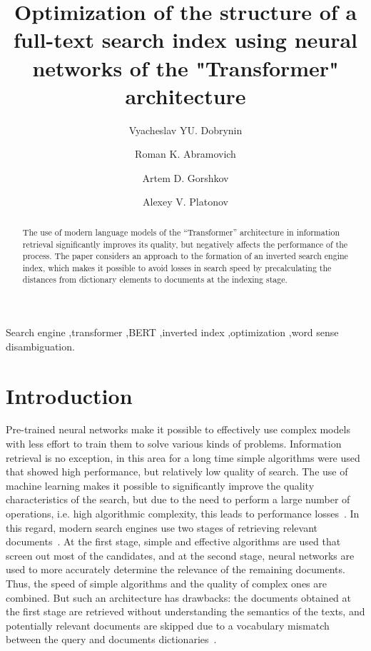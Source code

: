 \documentclass[
    twocolumn,
]{template/ceurart}
\begin{document}
    \title{Optimization of the structure of a full-text search index using neural networks of the "Transformer" architecture}
    \author[1]{Vyacheslav YU. Dobrynin}
    \author[1]{Roman K. Abramovich}
    \author[1]{Artem D. Gorshkov}
    \author[1]{Alexey V. Platonov}
    \address[1]{ITMO University, Kronverksky Pr. 49, bldg. A, Saint-Petersburg, 197101, Russian Federation}
    \begin{abstract}
        The use of modern language models of the ``Transformer'' architecture in information retrieval significantly
        improves its quality, but negatively affects the performance of the process.
        The paper considers an approach to the formation of an inverted search engine index,
        which makes it possible to avoid losses in search speed by precalculating the distances from dictionary
        elements to documents at the indexing stage.
    \end{abstract}
    \begin{keywords}
        Search engine \sep transformer \sep BERT \sep inverted index \sep optimization \sep word sense disambiguation.
    \end{keywords}
    \maketitle


    \section{Introduction}
    Pre-trained neural networks make it possible to effectively use complex models with less effort
    to train them to solve various kinds of problems.
    Information retrieval is no exception, in this area for a long time simple algorithms
    were used that showed high performance, but relatively low quality of search.
    The use of machine learning makes it possible to significantly improve the quality
    characteristics of the search, but due to the need to perform a large number of operations,
    i.e. high algorithmic complexity, this leads to performance losses~\cite{performanceLoss}.
    In this regard, modern search engines use two stages of retrieving relevant documents~\cite{multiStageRetrieval}.
    At the first stage, simple and effective algorithms are used that screen out most of the candidates,
    and at the second stage, neural networks are used to more accurately determine
    the relevance of the remaining documents.
    Thus, the speed of simple algorithms and the quality of complex ones are combined.
    But such an architecture has drawbacks: the documents obtained at the first stage are retrieved
    without understanding the semantics of the texts, and potentially relevant documents are skipped
    due to a vocabulary mismatch between the query and documents dictionaries~\cite{vocabularyMismatch1,vocabularyMismatch2}.
\end{document}
